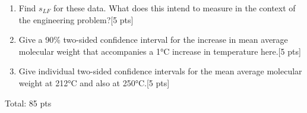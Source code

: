 \documentclass[11pt]{article}\usepackage[]{graphicx}\usepackage[]{color}
\begin{document}
\begin{enumerate}
\begin{centering}
\begin{enumerate}
    
    \item Find $s_{LF}$ for these data. What does this intend to measure in the context of the engineering problem?[5 pts]
    
    \item Give a 90\% two-sided confidence interval for the increase in mean average molecular weight that accompanies a 1°C increase in temperature here.[5 pts]
    
    \item Give individual two-sided confidence intervals for the mean average molecular weight at 212°C and also at 250°C.[5 pts]
\end{enumerate}        
\end{centering}
    

  
Total: 85 pts


\end{enumerate}
\end{document}
